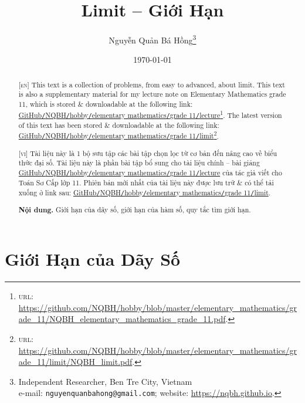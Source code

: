 \documentclass{article}
\title{Limit -- Giới Hạn}
\author{Nguyễn Quản Bá Hồng\footnote{Independent Researcher, Ben Tre City, Vietnam\\e-mail: \texttt{nguyenquanbahong@gmail.com}; website: \url{https://nqbh.github.io}.}}
\date{\today}
\begin{document}
\maketitle
\begin{abstract}
	\textsc{[en]} This text is a collection of problems, from easy to advanced, about limit. This text is also a supplementary material for my lecture note on Elementary Mathematics grade 11, which is stored \& downloadable at the following link: \href{https://github.com/NQBH/hobby/blob/master/elementary_mathematics/grade_11/NQBH_elementary_mathematics_grade_11.pdf}{GitHub\texttt{/}NQBH\texttt{/}hobby\texttt{/}elementary mathematics\texttt{/}grade 11\texttt{/}lecture}\footnote{\textsc{url}: \url{https://github.com/NQBH/hobby/blob/master/elementary_mathematics/grade_11/NQBH_elementary_mathematics_grade_11.pdf}.}. The latest version of this text has been stored \& downloadable at the following link: \href{https://github.com/NQBH/hobby/blob/master/elementary_mathematics/grade_11/limit/NQBH_limit.pdf}{GitHub\texttt{/}NQBH\texttt{/}hobby\texttt{/}elementary mathematics\texttt{/}grade 11\texttt{/}limit}\footnote{\textsc{url}: \url{https://github.com/NQBH/hobby/blob/master/elementary_mathematics/grade_11/limit/NQBH_limit.pdf}.}.
	\vspace{2mm}
	
	\textsc{[vi]} Tài liệu này là 1 bộ sưu tập các bài tập chọn lọc từ cơ bản đến nâng cao về biểu thức đại số. Tài liệu này là phần bài tập bổ sung cho tài liệu chính -- bài giảng \href{https://github.com/NQBH/hobby/blob/master/elementary_mathematics/grade_11/NQBH_elementary_mathematics_grade_11.pdf}{GitHub\texttt{/}NQBH\texttt{/}hobby\texttt{/}elementary mathematics\texttt{/}grade 11\texttt{/}lecture} của tác giả viết cho Toán Sơ Cấp lớp 11. Phiên bản mới nhất của tài liệu này được lưu trữ \& có thể tải xuống ở link sau: \href{https://github.com/NQBH/hobby/blob/master/elementary_mathematics/grade_11/limit/NQBH_limit.pdf}{GitHub\texttt{/}NQBH\texttt{/}hobby\texttt{/}elementary mathematics\texttt{/}grade 11\texttt{/}limit}.
	
	\textsf{\textbf{Nội dung.} Giới hạn của dãy số, giới hạn của hàm số, quy tắc tìm giới hạn.}
\end{abstract}
\tableofcontents
\newpage


\section{Giới Hạn của Dãy Số}
\end{document}

